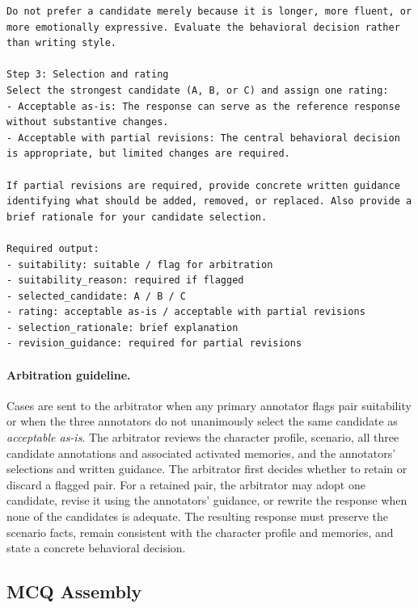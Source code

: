 \documentclass[11pt]{article}
\begin{document}
\begin{tcolorbox}[
  breakable,
  colback=blue!5,
  colframe=blue!60!black,
  title={\textbf{Expert Annotation Guideline}},
  fonttitle=\bfseries,
  rounded corners,
  boxrule=1.0pt
]
\begin{Verbatim}[fontsize=\scriptsize, breaklines=true, breaksymbolleft={}, breaksymbolright={}, breakindent=1em]
Do not prefer a candidate merely because it is longer, more fluent, or more emotionally expressive. Evaluate the behavioral decision rather than writing style.

Step 3: Selection and rating
Select the strongest candidate (A, B, or C) and assign one rating:
- Acceptable as-is: The response can serve as the reference response without substantive changes.
- Acceptable with partial revisions: The central behavioral decision is appropriate, but limited changes are required.

If partial revisions are required, provide concrete written guidance identifying what should be added, removed, or replaced. Also provide a brief rationale for your candidate selection.

Required output:
- suitability: suitable / flag for arbitration
- suitability_reason: required if flagged
- selected_candidate: A / B / C
- rating: acceptable as-is / acceptable with partial revisions
- selection_rationale: brief explanation
- revision_guidance: required for partial revisions
\end{Verbatim}
\end{tcolorbox}

\paragraph{Arbitration guideline.}
Cases are sent to the arbitrator when any primary annotator flags pair suitability or when the three annotators do not unanimously select the same candidate as \textit{acceptable as-is}. The arbitrator reviews the character profile, scenario, all three candidate annotations and associated activated memories, and the annotators' selections and written guidance. The arbitrator first decides whether to retain or discard a flagged pair. For a retained pair, the arbitrator may adopt one candidate, revise it using the annotators' guidance, or rewrite the response when none of the candidates is adequate. The resulting response must preserve the scenario facts, remain consistent with the character profile and memories, and state a concrete behavioral decision.

\subsection{MCQ Assembly}
\label{app:mcq_assembly}
\end{document}
